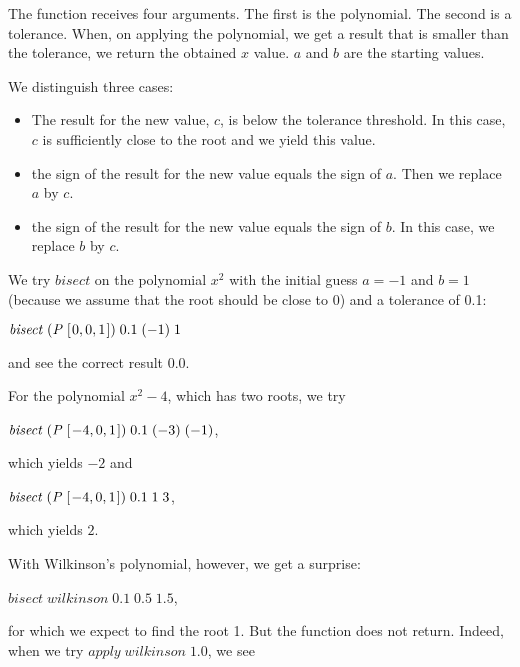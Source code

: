\documentclass[tikz]{scrreprt}
\newcommand{\Conid}[1]{\mathit{#1}}
\newcommand{\Varid}[1]{\mathit{#1}}
\begin{document}
The function receives four arguments.
The first is the polynomial.
The second is a tolerance.
When, on applying the polynomial,
we get a result that is smaller
than the tolerance, we return the obtained $x$ value.
$a$ and $b$ are the starting values.

\begin{minipage}{\textwidth}
We distinguish three cases:
\begin{itemize}
\item The result for the new value, $c$, 
      is below the tolerance threshold.
      In this case, $c$ is sufficiently close
      to the root and we yield this value.
\item the sign of the result for the new value
      equals the sign of $a$. Then we replace
      $a$ by $c$.
\item the sign of the result for the new value
      equals the sign of $b$. In this case,
      we replace $b$ by $c$.
\end{itemize}
\end{minipage}

We try \ensuremath{\Varid{bisect}} on the polynomial $x^2$ with
the initial guess $a=-1$ and $b=1$ (because we
assume that the root should be close to 0) and
a tolerance of 0.1:

\ensuremath{\Varid{bisect}\;(\Conid{P}\;[\mskip1.5mu \mathrm{0},\mathrm{0},\mathrm{1}\mskip1.5mu])\;\mathrm{0.1}\;(\mathbin{-}\mathrm{1})\;\mathrm{1}}

and see the correct result \ensuremath{\mathrm{0.0}}.

For the polynomial $x^2 - 4$, which has two roots,
we try 

\ensuremath{\Varid{bisect}\;(\Conid{P}\;[\mskip1.5mu \mathbin{-}\mathrm{4},\mathrm{0},\mathrm{1}\mskip1.5mu])\;\mathrm{0.1}\;(\mathbin{-}\mathrm{3})\;(\mathbin{-}\mathrm{1})},

which yields \ensuremath{\mathbin{-}\mathrm{2}} and 

\ensuremath{\Varid{bisect}\;(\Conid{P}\;[\mskip1.5mu \mathbin{-}\mathrm{4},\mathrm{0},\mathrm{1}\mskip1.5mu])\;\mathrm{0.1}\;\mathrm{1}\;\mathrm{3}},

which yields \ensuremath{\mathrm{2}}.

With Wilkinson's polynomial, however,
we get a surprise:

\ensuremath{\Varid{bisect}\;\Varid{wilkinson}\;\mathrm{0.1}\;\mathrm{0.5}\;\mathrm{1.5}},

for which we expect to find the root 1.
But the function does not return.
Indeed, when we try \ensuremath{\Varid{apply}\;\Varid{wilkinson}\;\mathrm{1.0}}, we see
\end{document}
